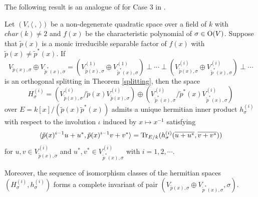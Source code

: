 \documentclass[12pt]{amsart}
\begin{document}
The following result is an analogue of \cite[Theorem 3.3]{Mil} for Case 3 in \cite[\S 3]{Mil}. 

\begin{thm} \label{complete invariant} Let $(V,  \langle \  , \  \rangle)$ be a non-degenerate quadratic space over a field of $k$ with $char(k)\neq 2$ and $f(x)$ be the characteristic polynomial of $\sigma\in {\rm O}(V)$.  Suppose that  $\tilde{p}(x)$ is a monic irreducible separable factor of $f(x)$ with 
$ \tilde{p}(x) \neq \tilde{p}^*(x) $. If
$$ V_{\tilde{p}(x), \sigma} \oplus V_{\tilde{p}^*(x), \sigma}  = (V_{\tilde{p}(x), \sigma}^ {(1)}\oplus V_{\tilde{p}^*(x), \sigma}^ {(1)}) \perp \cdots \perp (V_{\tilde{p}(x), \sigma}^ {(i)} \oplus V_{\tilde{p}^*(x), \sigma}^ {(i)}) \perp \cdots $$
is an orthogonal splitting in Theorem \ref{splitting}, then the space 
$$ H_{\sigma}^{(i)}= (V_{\tilde{p}(x), \sigma}^ {(i)}/\tilde{p}(x) V_{\tilde{p}(x), \sigma}^ {(i)})  \oplus (V_{\tilde{p}^*(x), \sigma}^ {(i)} / \tilde{p}^*(x) V_{\tilde{p}^*(x), \sigma}^ {(i)} )$$ over $E=k[x]/(\tilde{p}(x) \tilde{p}^*(x))$ admits a unique hermitian inner product $h_{\sigma}^{(i)}$ with respect to the involution $\iota$ induced by $x\mapsto x^{-1}$ satisfying 
$$ \langle \tilde{p}(x)^{i-1} u +u^* , \tilde{p}(x)^{i-1} v + v^* \rangle = {\rm Tr}_{E/k} (h_{\sigma}^{(i)} (\overline{u+u^*}, \overline{v+v^*})) $$ for $u, v \in V_{\tilde{p}(x), \sigma}^ {(i)} $ and $u^*, v^* \in V_{\tilde{p}^*(x), \sigma}^ {(i)}$ with $i=1, 2, \cdots$.  

Moreover, the sequence of isomorphism classes of the hermitian spaces $(H_{\sigma}^{(i)}, h_{\sigma}^{(i)})$ forms a complete invariant of pair $(V_{\tilde{p}(x), \sigma} \oplus V_{\tilde{p}^*(x), \sigma} , \sigma) $. 
\end{thm}
\end{document}

